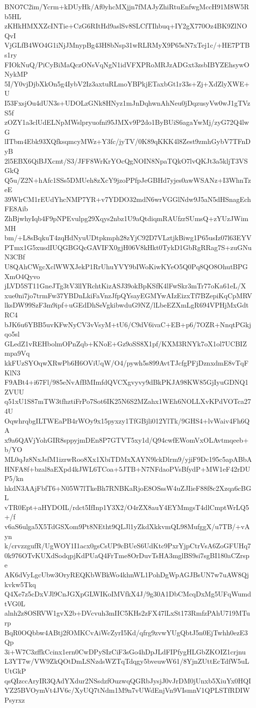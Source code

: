BNO7C2im/Ycrm+kDUyHk/Af0yhcMXjjn7fMAJyZhiRtuEnfwgMccH91M8W5Rb5HL
zKHkHMXXZcINTie+CzG6RItHd9aslSv8SLCfTIhbuq+IY2gX770Oz4BK9ZlNOQvI
VjGLfB4WO4G1iNjJMnypBg43H8bNsp31wRLRMyX9P65sN7xTej1c/+HE7PTBs1ry
FIOkNuQ/PiCyBiMaQczONsVqNgN1idVFXPRoMRJzADGxt3zsbIBYZEhsywONykMP
5I/Y0vjDjbXkOn5g4IybV2Iz3axtuRLmoYBPkjETaxbGt1r33s+Zj+XdZlyXWE+U
I53FxsjOu4dUN3s+UDOLzGNk8HNyz1mJnDqhwnAhNeu0jDqzusyVw0wJ1gTVzS5f
zOZY1a3clUdELNpMWslpryuofni95JMXv9P2do1ByBUiS6agaYwMj/zyG72Q4lwG
lITbm4Ebk93XQfksqmcyMWz+Y3fc/jyTV/0K89qKKK4l8Zest9zmhGybV7TFnDyB
2l5EBX6QiBJXcmt/S3/JFF8WrKrYOcQgNOIN8NpaTQkO7lvQKJt3a5kljT3VSGkQ
Q5u/Z2N+hAfc1SSs5DMUeh8zXcY9jzoPPfpJeGBHd7yjes0awWSANz+I3WhnTzeE
39WlrCM1rEUdYhcNMP7YR+v7YDDO32mdN6wrVGGlNdw9J5aN5dHSnagEchFE8Aib
ZhBjwhyIqb4F9pNPEvulpg29Xqys2nbz1U9aQtdiqmRAUfzrSUmsQ+zYUzJWimMH
bm/+L8sBqkuT4zqHdNyuUDtpkmph28zYjC92D7VLztjkBiwg1P65usIz07l63EYV
PTmx1G5xusdIUQGBGQcGAVIFX0gjH06V8kHkt0TykD1GbRgRRag7S+zuGNuN3CBf
U8QAhCWgcXclWWXJekP1RrUhuYVY9bIWoKiwKYeO5Q0Pq8QO8OhutBPGXmO4Qyvo
jLVD5ST11GneJTg3tV3llYRchtKizASJ39okBpKSfK4lFwSkr3mTr77oKa61eL/X
xue0ni7jo7trmFw37YBDnLkiFaVnzJfpQYsayEGMYwAIzEizxTf7BZepiKqCpMRV
lksDW99SzF3m9ipf+uGEdDhSeVgkibwduG9NZ/lLbeEZXmLgR694VPHjMxGdtRC4
bJK6u6YBB5uvKFwNyCV3vVsyM+tU6/C9dV6ivaC+EB+p6/7OZR+NnqtPGkjqo5sl
GLedZ1vREHbolmOPnZqb+KNoE+Gz9oSS8X1pf/KXM3RNYk7oX1ol7UCBIZmpa9Vq
kkFUzSYOqwXRwPb6H6OViUqW/O4/pywh5s899AvtTJcfgPFjDznxdmE8vTqFKlN3
F9ABt4+i67Fl/985eNvAfBMImfdQVCXgvyvy9dBkPKJA98KW85GjIyuGDNQ1ZVUU
q51xU1S87mTW3tfhztiFrPo7Sot6IK25N6S2MZahx1WEh6NOLLXvKPdVOTca274U
OqwhrqbgILTWEaPB4rWOy9x15pyxzy1TfGBjli012YlTk/9GHS4+lvWaiv4Fh6QA
x9a6QAVjYohGIR8sppyjmDEn8P7GTVT5xy1d/Q94cwfEWomVxOLAvtmqeeb+b/YO
ML0qJz8NxJsfM1izrwRoo8Xx1XbiTDMxXAYN9lckDlrm9/yjiF9Dc195c5apABbA
HNFA8f+bzal8aEXpd4kJWL6TCoa+5JTB+N7NFdaoPVsBfydP+MW1eF42rDUP5/kn
hkdN3AAjFbfT6+N05W7lTkeBh7RNBKaRjoE8OSssW4uZJIieF88f8c2Xzqa6cBGL
vTR0Ept+aHYDOIL/rdct5IfInp1Y3X2/O4rZX8auY4EYMmgsT4dlCmptWrLQ5+/f
v6aS6ulga5X5TdGSXom9Pt8NEtht9QLJl1yZkdXkkvmQL98MufggX/u7TB/+vAyn
k/crvzzgufR/UgWOY1I1acx0gsCsUP9cBUeS6UdKtc9PxrYjpCtrVsA6ZoGFUHq7
0k976OTvKUXdSodqpjKdPUaQ4FrTme8OrDuvTsHA3mglBS9si7sgBI180aCZrspe
AK6dVyLgcUbw3OryREQKbWBkWo4khnWL1PohDgWpAGJBsUN7w7uAW8Qjkvkw5Tkq
Q4Xe7z5cDxVJl9CnJGXpGLWIKoIMVfkX4J/9g30A1DbCMcqDxMg5UFqWumdtVG0L
alnh2z8OSRVW1gvX2b+DVcvuh3mIIC5KHs2zFX47lLxSt173RmfzPAhU719MTurp
BqR0OQbbw4ABtj2fOMKCvAiWcZyrI5Kd/qfrg9zvwYUgQbtJ5n0EjTwhh0ezE3Qp
3i+W7C3zffkCcinx1ern0CwDPySIzCiF3sGo4hDpJLdFIPfygHLGbZKOIZ1crjnu
L3YT7w/VW9ZkQOtDmLSNzdsWZTqTdqgy5bveuwW61/8YjnZUttEcTdfW5uLUtGkP
qsQIzccAryIR3QAdYXdur2NSsdzfOuzwqQGRbJysjJ0vJrDM0jUnxb5XiuYx0HQI
YZ25BVOymVt4JV6c/XyUQ7tNdm1M9n7vUWdEnjVn9VIsmnV1QPLSTfRDIWPsyrxz
